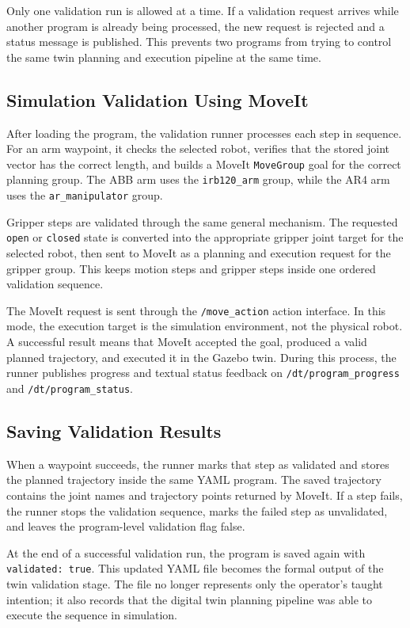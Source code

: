 Only one validation run is allowed at a time. If a validation request arrives while another program is already being processed, the new request is rejected and a status message is published. This prevents two programs from trying to control the same twin planning and execution pipeline at the same time.

\subsection{Simulation Validation Using MoveIt}

After loading the program, the validation runner processes each step in sequence. For an arm waypoint, it checks the selected robot, verifies that the stored joint vector has the correct length, and builds a MoveIt \texttt{MoveGroup} goal for the correct planning group. The ABB arm uses the \texttt{irb120\_arm} group, while the AR4 arm uses the \texttt{ar\_manipulator} group.

Gripper steps are validated through the same general mechanism. The requested \texttt{open} or \texttt{closed} state is converted into the appropriate gripper joint target for the selected robot, then sent to MoveIt as a planning and execution request for the gripper group. This keeps motion steps and gripper steps inside one ordered validation sequence.

The MoveIt request is sent through the \texttt{/move\_action} action interface. In this mode, the execution target is the simulation environment, not the physical robot. A successful result means that MoveIt accepted the goal, produced a valid planned trajectory, and executed it in the Gazebo twin. During this process, the runner publishes progress and textual status feedback on \texttt{/dt/program\_progress} and \texttt{/dt/program\_status}.

\subsection{Saving Validation Results}

When a waypoint succeeds, the runner marks that step as validated and stores the planned trajectory inside the same YAML program. The saved trajectory contains the joint names and trajectory points returned by MoveIt. If a step fails, the runner stops the validation sequence, marks the failed step as unvalidated, and leaves the program-level validation flag false.

At the end of a successful validation run, the program is saved again with \texttt{validated: true}. This updated YAML file becomes the formal output of the twin validation stage. The file no longer represents only the operator's taught intention; it also records that the digital twin planning pipeline was able to execute the sequence in simulation.


